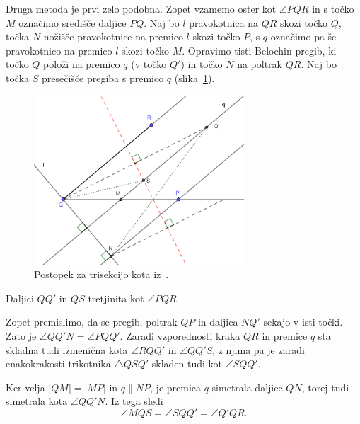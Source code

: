 Druga metoda je prvi zelo podobna. Zopet vzamemo oster kot $\angle PQR$ in s točko $M$ označimo središče daljice $PQ$. Naj bo $l$ pravokotnica na $QR$ skozi točko $Q$, točka $N$ nožišče pravokotnice na premico $l$ skozi točko $P$, s $q$ označimo pa še pravokotnico na premico $l$ skozi točko $M$. Opravimo tisti Belochin pregib, ki točko $Q$ položi na premico $q$ (v točko $Q'$) in točko $N$ na poltrak $QR$. Naj bo točka $S$ presečišče pregiba s premico $q$ (slika~\ref{fig:trisection_10.14}).

\begin{figure}[h]
    \centering
    \includegraphics[width=0.7\textwidth]{images/starogr_problemi/trisection_10.14.png}
    \caption[Trisekcija ostrega kota]{Postopek za trisekcijo kota iz~\cite[str.\ 158--159]{geometricconstructions}.}
    \label{fig:trisection_10.14}
\end{figure}

\begin{trditev}
    Daljici $QQ'$ in $QS$ tretjinita kot $\angle PQR$.
\end{trditev}
\begin{dokaz}
    Zopet premislimo, da se pregib, poltrak $QP$ in daljica $NQ'$ sekajo v isti točki. Zato je $\angle QQ'N = \angle PQQ'$. Zaradi vzporednosti kraka $QR$ in premice $q$ sta skladna tudi izmenična kota $\angle RQQ'$ in $\angle QQ'S$, z njima pa je zaradi enakokrakosti trikotnika $\triangle QSQ'$ skladen tudi kot $\angle SQQ'$.

    Ker velja $|QM| = |MP|$ in $q \parallel NP$, je premica $q$ simetrala daljice $QN$, torej tudi simetrala kota $\angle QQ'N$. Iz tega sledi
    $$ \angle MQS = \angle SQQ' = \angle Q'QR.$$
\end{dokaz}